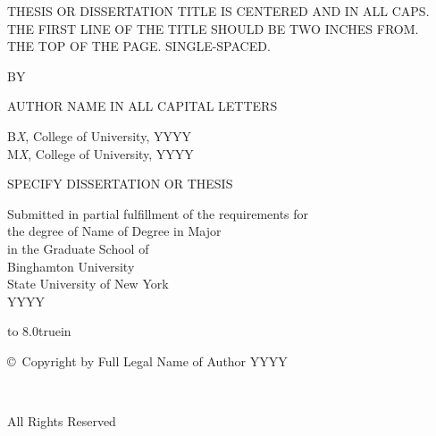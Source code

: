 \documentclass[12pt,oneside, letterpaper]{book}
\begin{document}


\begin{titlepage}
 \begin{center}

THESIS OR DISSERTATION TITLE IS CENTERED AND IN ALL CAPS.\\
THE FIRST LINE OF THE TITLE SHOULD BE TWO INCHES FROM.\\
THE TOP OF THE PAGE. SINGLE-SPACED.

 \vspace{6.5cm} 
 
BY

\vspace{0.7cm}

AUTHOR NAME IN ALL CAPITAL LETTERS 

\vspace{0.7cm}

B\textit{X}, College of University, YYYY\\
M\textit{X}, College of University, YYYY
 
\vfill 
\vspace{0.8cm}
 
SPECIFY DISSERTATION OR THESIS

\vspace{0.8cm}

Submitted in partial fulfillment of the requirements for\\
the degree of Name of Degree in Major\\
in the Graduate School of\\
Binghamton University\\
State University of New York\\
YYYY
  
   \end{center}
\end{titlepage}

\newpage

\thispagestyle{empty}

\vbox to 8.0truein{}

\centerline{\copyright\ Copyright by Full Legal Name of Author YYYY}

\

\centerline{All Rights Reserved}

\newpage
\addtocounter{page}{1}
\end{document}
